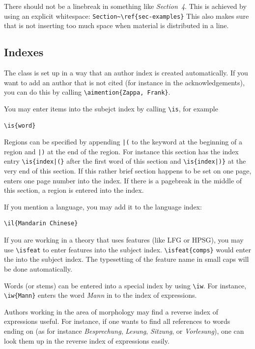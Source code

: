 There should not be a linebreak in something like \emph{Section~4}. This is achieved by using an explicit
whitespace: \verb+Section~\ref{sec-examples}+ This also makes sure that \latex is not inserting too
much space when material is distributed in a line.

\subsection{Indexes}

The \lsp class is set up in a way that an author index is created automatically. If you want to add
an author that is not cited (for instance in the acknowledgements), you can do this by calling
\verb+\aimention{Zappa, Frank}+.

You may enter items into the subejct index by calling \verb+\is+, for example 
\begin{verbatim}
\is{word}
\end{verbatim}

Regions can be specified by appending \verb+|(+ to the keyword at the beginning of a region and
\verb+|)+ at the end of the region. For instance this section has the index entry
\verb+\is{index|(}+ after the first word of this section and \verb+\is{index|)}+ at the very end of
this section. If this rather brief section happens to be set on one page, \latex enters one page
number into the index. If there is a pagebreak in the middle of this section, a region is entered
into the index.

If you mention a language, you may add it to the language index: 
\begin{verbatim}
\il{Mandarin Chinese}
\end{verbatim}
If you are working in a theory that uses features (like LFG or HPSG), you may use \verb+\isfeat+ to enter
features into the subject index. \verb+\isfeat{comps}+ would enter the \compsf into the subject
index. The typesetting of the feature name in {\sc small caps} will be done automatically.

Words (or stems) can be entered into a special index by using \verb+\iw+. For instance,
\verb+\iw{Mann}+ enters the word \emph{Mann} in to the index of expressions.

Authors working in the area of morphology may find a reverse index of expressions useful. For
instance, if one wants to find all references to words ending on  (as for instance \emph{Besprechung}, \emph{Lesung},
\emph{Sitzung}, or \emph{Vorlesung}), one can look them up
in the reverse index of expressions easily.


